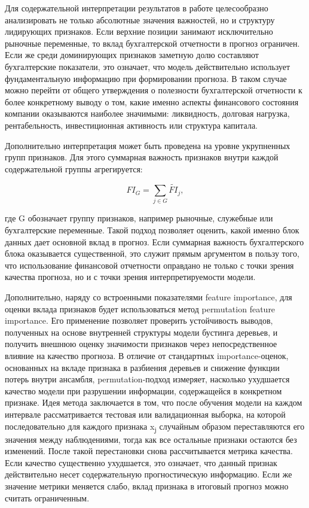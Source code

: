 \documentclass[
]{article}
\begin{document}
Для содержательной интерпретации результатов в работе целесообразно анализировать не только абсолютные значения важностей, но и структуру лидирующих признаков. Если верхние позиции занимают исключительно рыночные переменные, то вклад бухгалтерской отчетности в прогноз ограничен. Если же среди доминирующих признаков заметную долю составляют бухгалтерские показатели, это означает, что модель действительно использует фундаментальную информацию при формировании прогноза. В таком случае можно перейти от общего утверждения о полезности бухгалтерской отчетности к более конкретному выводу о том, какие именно аспекты финансового состояния компании оказываются наиболее значимыми: ликвидность, долговая нагрузка, рентабельность, инвестиционная активность или структура капитала.

Дополнительно интерпретация может быть проведена на уровне укрупненных групп признаков. Для этого суммарная важность признаков внутри каждой содержательной группы агрегируется:

\[FI_{G} = \sum_{j \in G}^{}{\widetilde{FI}}_{j},\]

где G обозначает группу признаков, например рыночные, служебные или бухгалтерские переменные. Такой подход позволяет оценить, какой именно блок данных дает основной вклад в прогноз. Если суммарная важность бухгалтерского блока оказывается существенной, это служит прямым аргументом в пользу того, что использование финансовой отчетности оправдано не только с точки зрения качества прогноза, но и с точки зрения интерпретируемости модели.

Дополнительно, наряду со встроенными показателями feature importance, для оценки вклада признаков будет использоваться метод permutation feature importance. Его применение позволяет проверить устойчивость выводов, полученных на основе внутренней структуры модели бустинга деревьев, и получить внешнюю оценку значимости признаков через непосредственное влияние на качество прогноза. В отличие от стандартных importance-оценок, основанных на вкладе признака в разбиения деревьев и снижение функции потерь внутри ансамбля, permutation-подход измеряет, насколько ухудшается качество модели при разрушении информации, содержащейся в конкретном признаке. Идея метода заключается в том, что после обучения модели на каждом интервале рассматривается тестовая или валидационная выборка, на которой последовательно для каждого признака x\textsubscript{j} случайным образом переставляются его значения между наблюдениями, тогда как все остальные признаки остаются без изменений. После такой перестановки снова рассчитывается метрика качества. Если качество существенно ухудшается, это означает, что данный признак действительно несет содержательную прогностическую информацию. Если же значение метрики меняется слабо, вклад признака в итоговый прогноз можно считать ограниченным.
\end{document}
